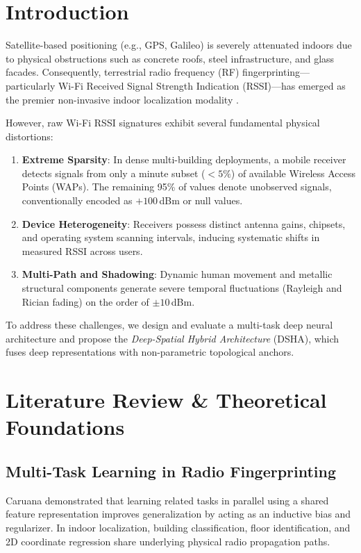 \documentclass[conference]{IEEEtran}
\begin{document}
\section{Introduction}
Satellite-based positioning (e.g., GPS, Galileo) is severely attenuated indoors due to physical obstructions such as concrete roofs, steel infrastructure, and glass facades. Consequently, terrestrial radio frequency (RF) fingerprinting—particularly Wi-Fi Received Signal Strength Indication (RSSI)—has emerged as the premier non-invasive indoor localization modality \cite{nowicki2017}.

However, raw Wi-Fi RSSI signatures exhibit several fundamental physical distortions:
\begin{enumerate}
    \item \textbf{Extreme Sparsity}: In dense multi-building deployments, a mobile receiver detects signals from only a minute subset ($< 5\%$) of available Wireless Access Points (WAPs). The remaining 95\% of values denote unobserved signals, conventionally encoded as $+100$\,dBm or null values.
    \item \textbf{Device Heterogeneity}: Receivers possess distinct antenna gains, chipsets, and operating system scanning intervals, inducing systematic shifts in measured RSSI across users.
    \item \textbf{Multi-Path and Shadowing}: Dynamic human movement and metallic structural components generate severe temporal fluctuations (Rayleigh and Rician fading) on the order of $\pm 10$\,dBm.
\end{enumerate}

To address these challenges, we design and evaluate a multi-task deep neural architecture and propose the \textit{Deep-Spatial Hybrid Architecture} (DSHA), which fuses deep representations with non-parametric topological anchors.

\section{Literature Review \& Theoretical Foundations}
\subsection{Multi-Task Learning in Radio Fingerprinting}
Caruana \cite{caruana1997} demonstrated that learning related tasks in parallel using a shared feature representation improves generalization by acting as an inductive bias and regularizer. In indoor localization, building classification, floor identification, and 2D coordinate regression share underlying physical radio propagation paths.
\end{document}
